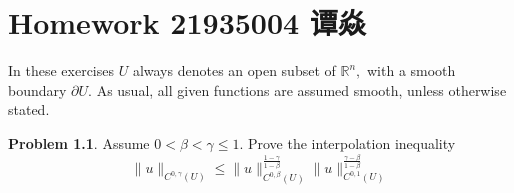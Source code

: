 \documentclass[a4paper]{book}
\makeatletter
\newcommand{\voidenvironment}[1]{%
  \expandafter\providecommand\csname env@#1@save@env\endcsname{}%
  \expandafter\providecommand\csname env@#1@process\endcsname{}%
  \@ifundefined{#1}{}{\RenewEnviron{#1}{}}%
}
\numberwithin{equation}{chapter}
\theoremstyle{definition}
\newtheorem{problem}[exm]{Problem}
\makeatother
\begin{document}
\pagestyle{empty}
% 



\setcounter{chapter}{13}




\chapter{Homework 21935004 谭焱}

In these exercises $U$ always denotes an open subset of $\mathbb{R}^{n},$ with a smooth boundary $\partial U$. As usual, all given functions are assumed smooth, unless otherwise stated.
\begin{problem}Assume $0<\beta<\gamma \leq 1 .$ Prove the interpolation inequality
  \[
    \|u\|_{C^{0, \gamma}(U)} \leq\|u\|_{C^{0, \beta}(U)}^{\frac{1-\gamma}{1-\beta}}\|u\|_{C^{0,1}(U)}^{\frac{\gamma-\beta}{1-\beta}}
  \]
\end{problem}
\end{document}
